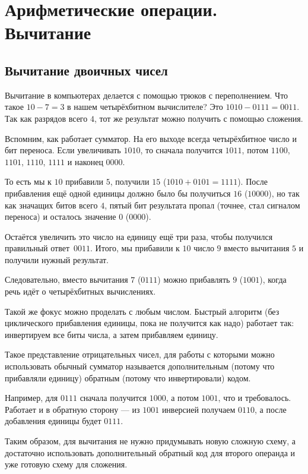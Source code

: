 \chapter{Арифметические операции. Вычитание}

\section{Вычитание двоичных чисел}

Вычитание в компьютерах делается с помощью трюков с переполнением.
Что такое $10-7=3$ в нашем четырёхбитном вычислителе?
Это $1010-0111=0011$. Так как разрядов всего $4$, тот же результат
можно получить с помощью сложения.

Вспомним, как работает сумматор. На его выходе всегда четырёхбитное число
и бит переноса. Если увеличивать $1010$, то сначала получится $1011$,
потом $1100$, $1101$, $1110$, $1111$ и наконец $0000$.

То есть мы к $10$ прибавили $5$, получили $15$
($1010+0101=1111$). После прибавления ещё одной единицы должно было бы получиться
$16$ ($10000$), но так как значащих битов всего $4$, пятый бит результата
пропал (точнее, стал сигналом переноса) и осталось значение $0$ ($0000$).

Остаётся увеличить это число на единицу ещё три раза, чтобы получился
правильный ответ~$0011$. Итого, мы прибавили к $10$ число $9$ вместо вычитания $5$
и получили нужный результат.

Следовательно, вместо вычитания $7$ ($0111$) можно прибавлять $9$ ($1001$),
когда речь идёт о четырёхбитных вычислениях.

Такой же фокус можно проделать с любым числом. Быстрый алгоритм
(без циклического прибавления единицы, пока не получится как надо) работает так:
инвертируем все биты числа, а затем прибавляем единицу.

Такое представление отрицательных чисел, для работы с которыми можно использовать обычный сумматор
называется дополнительным (потому что прибавляли единицу) обратным (потому что инвертировали) кодом.

Например, для $0111$ сначала получится $1000$, а потом $1001$, что и требовалось.
Работает и в обратную сторону --- из $1001$ инверсией получаем $0110$,
а после добавления единицы будет $0111$.

Таким образом, для вычитания не нужно придумывать новую сложную схему, а достаточно
использовать дополнительный обратный код для второго операнда и уже готовую схему для сложения.

